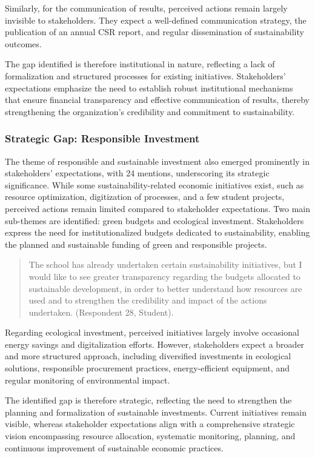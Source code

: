 \documentclass[12pt,a4paper]{article}
\begin{document}
Similarly, for the communication of results, perceived actions remain largely invisible to stakeholders. They expect a well-defined communication strategy, the publication of an annual CSR report, and regular dissemination of sustainability outcomes.

The gap identified is therefore institutional in nature, reflecting a lack of formalization and structured processes for existing initiatives. Stakeholders’ expectations emphasize the need to establish robust institutional mechanisms that ensure financial transparency and effective communication of results, thereby strengthening the organization’s credibility and commitment to sustainability.

\subsubsection{Strategic Gap: Responsible Investment}

The theme of responsible and sustainable investment also emerged prominently in stakeholders’ expectations, with 24 mentions, underscoring its strategic significance. While some sustainability-related economic initiatives exist, such as resource optimization, digitization of processes, and a few student projects, perceived actions remain limited compared to stakeholder expectations. Two main sub-themes are identified: green budgets and ecological investment. Stakeholders express the need for institutionalized budgets dedicated to sustainability, enabling the planned and sustainable funding of green and responsible projects.

\begin{quote}
The school has already undertaken certain sustainability initiatives, but I would like to see greater transparency regarding the budgets allocated to sustainable development, in order to better understand how resources are used and to strengthen the credibility and impact of the actions undertaken. (Respondent 28, Student).
\end{quote}

Regarding ecological investment, perceived initiatives largely involve occasional energy savings and digitalization efforts. However, stakeholders expect a broader and more structured approach, including diversified investments in ecological solutions, responsible procurement practices, energy-efficient equipment, and regular monitoring of environmental impact.

The identified gap is therefore strategic, reflecting the need to strengthen the planning and formalization of sustainable investments. Current initiatives remain visible, whereas stakeholder expectations align with a comprehensive strategic vision encompassing resource allocation, systematic monitoring, planning, and continuous improvement of sustainable economic practices.
\end{document}
